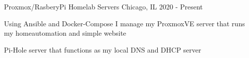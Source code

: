 

\begin{cventries}

  \cventry
    {Proxmox/RasberyPi} %
    {Homelab Servers} %
    {Chicago, IL} %
    {2020 - Present} %
    {
      \begin{cvitems} %
      \item {Using Ansible and Docker-Compose I manage my ProxmoxVE server that runs my homeautomation and simple website}
      \item {Pi-Hole server that functions as my local DNS and DHCP server}
      \end{cvitems}
    }

\end{cventries}
